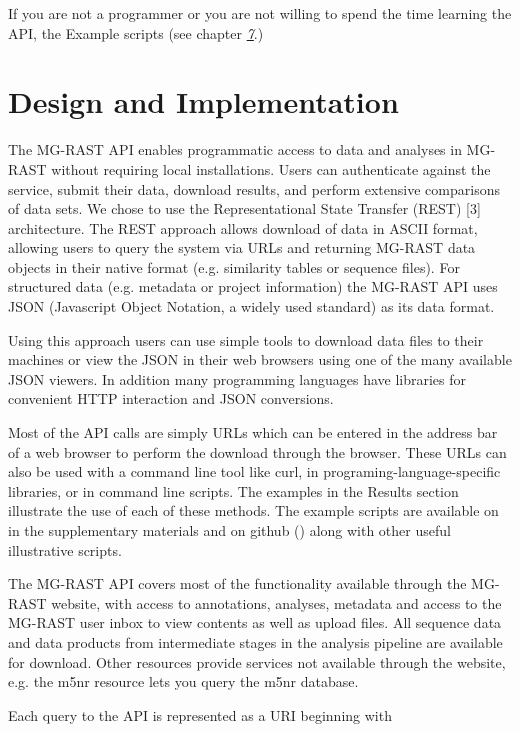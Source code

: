 \documentclass[letterpaper,10pt,english]{sphinxmanual}
\begin{document}
If you are not a programmer or you are not willing to spend the time
learning the API, the Example scripts (see chapter
{\hyperref[\detokenize{api:API-Examples}]{\emph{7}}}.)


\section{Design and Implementation}
\label{\detokenize{api:design-and-implementation}}
The MG-RAST API enables programmatic access to data and analyses in
MG-RAST without requiring local installations. Users can authenticate
against the service, submit their data, download results, and perform
extensive comparisons of data sets. We chose to use the Representational
State Transfer (REST) {[}3{]} architecture. The REST approach allows
download of data in ASCII format, allowing users to query the system via
URLs and returning MG-RAST data objects in their native format (e.g.
similarity tables or sequence files). For structured data (e.g. metadata
or project information) the MG-RAST API uses JSON (Javascript Object
Notation, a widely used standard) as its data format.

Using this approach users can use simple tools to download data files to
their machines or view the JSON in their web browsers using one of the
many available JSON viewers. In addition many programming languages have
libraries for convenient HTTP interaction and JSON conversions.

Most of the API calls are simply URLs which can be entered in the
address bar of a web browser to perform the download through the
browser. These URLs can also be used with a command line tool like curl,
in programing-language-specific libraries, or in command line scripts.
The examples in the Results section illustrate the use of each of these
methods. The example scripts are available on in the supplementary
materials and on github () along
with other useful illustrative scripts.

The MG-RAST API covers most of the functionality available through the
MG-RAST website, with access to annotations, analyses, metadata and
access to the MG-RAST user inbox to view contents as well as upload
files. All sequence data and data products from intermediate stages in
the analysis pipeline are available for download. Other resources
provide services not available through the website, e.g. the m5nr
resource lets you query the m5nr database.

Each query to the API is represented as a URI beginning with
\end{document}
